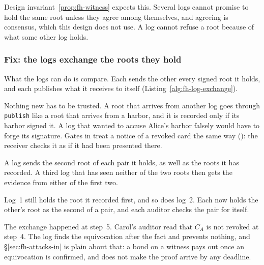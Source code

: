 Design invariant~\ref{prop:fh-witness} expects this. Several logs cannot
promise to hold the same root unless they agree among themselves, and
agreeing is consensus, which this design does not use. A log cannot refuse
a root because of what some other log holds.


\subsubsection{Fix: the logs exchange the roots they hold}

What the logs can do is compare. Each sends the other every signed root it
holds, and each publishes what it receives to itself
(Listing~\ref{alg:fh-log-exchange}).


Nothing new has to be trusted. A root that arrives from another log goes
through \texttt{publish} like a root that arrives from a harbor, and it is
recorded only if its harbor signed it. A log that wanted to accuse Alice's
harbor falsely would have to forge its signature. Gates in
 treat a notice of a revoked card
the same way (): the receiver
checks it as if it had been presented there.

A log sends the second root of each pair it holds, as well as the roots it
has recorded. A third log that has seen neither of the two roots then
gets the evidence from either of the first two.


Log~1 still holds the root it recorded first, and so does log~2. Each now
holds the other's root as the second of a pair, and each auditor checks
the pair for itself.

The exchange happened at step~5. Carol's auditor read that $C_A$ is not
revoked at step~4. The log finds the equivocation after the
fact and prevents nothing, and \S\ref{sec:fh-attacks-in} is plain about
that: a bond on a witness pays out once an equivocation is confirmed, and
does not make the proof arrive by any deadline.

